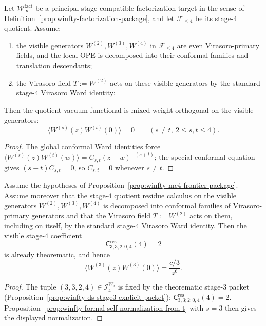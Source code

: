 \begin{proposition}
\label{prop:winfty-stage4-visible-orthogonality}
Let $\mathcal{W}^{\mathrm{fact}}_\infty$ be a principal-stage
compatible factorization target in the sense of
Definition~\ref{prop:winfty-factorization-package}, and let
$\mathcal{F}_{\le 4}$ be its stage-$4$ quotient.  Assume:
\begin{enumerate}[label=\textup{(\roman*)}]
\item the visible generators $W^{(2)},W^{(3)},W^{(4)}$ in
  $\mathcal{F}_{\le 4}$ are even Virasoro-primary fields, and the local
  OPE is decomposed into their conformal families and translation
  descendants;
\item the Virasoro field $T:=W^{(2)}$ acts on these visible generators
  by the standard stage-$4$ Virasoro Ward identity;
\end{enumerate}
Then the quotient vacuum functional is mixed-weight orthogonal on the
visible generators:
\[
\langle W^{(s)}(z)W^{(t)}(0)\rangle = 0
\qquad (s\neq t,\ 2\le s,t\le 4).
\]
\end{proposition}

\begin{proof}
The global conformal Ward identities force
$\langle W^{(s)}(z)W^{(t)}(w)\rangle = C_{s,t}(z-w)^{-(s+t)}$;
the special conformal equation gives $(s-t)C_{s,t}=0$,
so $C_{s,t}=0$ whenever $s\neq t$.
\end{proof}

\begin{proposition}
\label{prop:winfty-stage4-visible-w3-normalization}
Assume the hypotheses of
Proposition~\ref{prop:winfty-mc4-frontier-package}.  Assume moreover
that the stage-$4$ quotient residue calculus on the visible generators
$W^{(2)},W^{(3)},W^{(4)}$ is decomposed into conformal families of
Virasoro-primary generators and that the Virasoro field $T:=W^{(2)}$
acts on them, including on itself, by the standard stage-$4$
Virasoro Ward identity.  Then the visible stage-$4$ coefficient
\[
\mathsf{C}^{\mathrm{res}}_{3,3;2;0,4}(4)=2
\]
is already theorematic, and hence
\[
\langle W^{(3)}(z)W^{(3)}(0)\rangle=\frac{c/3}{z^{6}}.
\]
\end{proposition}

\begin{proof}
The tuple $(3,3,2,4)\in\mathcal{I}_4^{W_3}$ is fixed by the theorematic stage-$3$ packet (Proposition~\ref{prop:winfty-ds-stage3-explicit-packet}): $\mathsf{C}^{\mathrm{res}}_{3,3;2;0,4}(4)=2$.  Proposition~\ref{prop:winfty-formal-self-normalization-from-t} with $s=3$ then gives the displayed normalization.
\end{proof}

